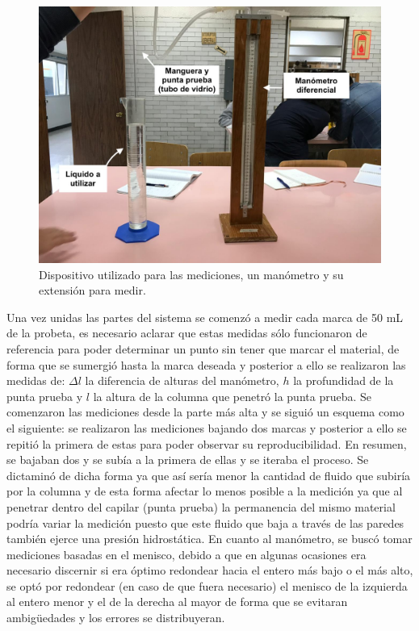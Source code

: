 \documentclass[a4paper]{article}
\begin{document}
\begin{figure}[H]
\centering
\includegraphics[scale=0.2]{manometro.jpeg}
\caption{Dispositivo utilizado para las mediciones, un manómetro y su extensión para medir.}
\end{figure}

Una vez unidas las partes del sistema se comenzó a medir cada marca de 50 mL de la probeta, es necesario aclarar que estas medidas sólo funcionaron de referencia para poder determinar un punto sin tener que marcar el material, de forma que se sumergió hasta la marca deseada y posterior a ello se realizaron las medidas de: $\Delta l$ la diferencia de alturas del manómetro, $h$ la profundidad de la punta prueba y $l$ la altura de la columna que penetró la punta prueba. Se comenzaron las mediciones desde la parte más alta y se siguió un esquema como el siguiente: se realizaron las  mediciones bajando dos marcas y posterior a ello se repitió la primera de estas para poder observar su reproducibilidad. En resumen, se bajaban dos y se subía a la primera de ellas y se iteraba el proceso. Se dictaminó de dicha forma ya que así sería menor la cantidad de fluido que subiría por la columna y de esta forma afectar lo menos posible a la medición ya que al penetrar dentro del capilar (punta prueba) la permanencia del mismo material podría variar la medición puesto que este fluido que baja a través de las paredes también ejerce una presión hidrostática. En cuanto al manómetro, se buscó tomar mediciones basadas en el menisco, debido a que en algunas ocasiones era necesario discernir si era óptimo redondear hacia el entero más bajo o el más alto, se optó por redondear (en caso de que fuera necesario) el menisco de la izquierda al entero menor y el de la derecha al mayor de forma que se evitaran ambigüedades y los errores se distribuyeran.
\end{document}

